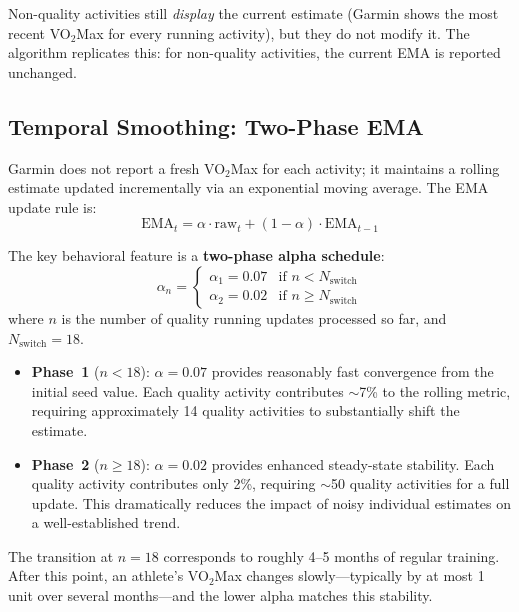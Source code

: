 \documentclass[11pt,a4paper]{article}
\begin{document}
Non-quality activities still \emph{display} the current estimate (Garmin shows the most recent VO$_2$Max for every running activity), but they do not modify it.
The algorithm replicates this: for non-quality activities, the current EMA is reported unchanged.


\subsection{Temporal Smoothing: Two-Phase EMA}
\label{sec:two-phase-alpha}

Garmin does not report a fresh VO$_2$Max for each activity; it maintains a rolling estimate updated incrementally via an exponential moving average.
The EMA update rule is:
\begin{equation}
\text{EMA}_t = \alpha \cdot \text{raw}_t + (1 - \alpha) \cdot \text{EMA}_{t-1}
\label{eq:ema}
\end{equation}

The key behavioral feature is a \textbf{two-phase alpha schedule}:
\begin{equation}
\alpha_n =
\begin{cases}
\alpha_1 = 0.07 & \text{if } n < N_{\text{switch}} \\
\alpha_2 = 0.02 & \text{if } n \geq N_{\text{switch}}
\end{cases}
\label{eq:two-phase-alpha}
\end{equation}
where $n$ is the number of quality running updates processed so far, and $N_{\text{switch}} = 18$.

\begin{itemize}[nosep]
    \item \textbf{Phase~1} ($n < 18$): $\alpha = 0.07$ provides reasonably fast convergence from the initial seed value.
    Each quality activity contributes $\sim$7\% to the rolling metric, requiring approximately 14 quality activities to substantially shift the estimate.

    \item \textbf{Phase~2} ($n \geq 18$): $\alpha = 0.02$ provides enhanced steady-state stability.
    Each quality activity contributes only 2\%, requiring $\sim$50 quality activities for a full update.
    This dramatically reduces the impact of noisy individual estimates on a well-established trend.
\end{itemize}

The transition at $n = 18$ corresponds to roughly 4--5 months of regular training.
After this point, an athlete's VO$_2$Max changes slowly---typically by at most 1 unit over several months---and the lower alpha matches this stability.
\end{document}
